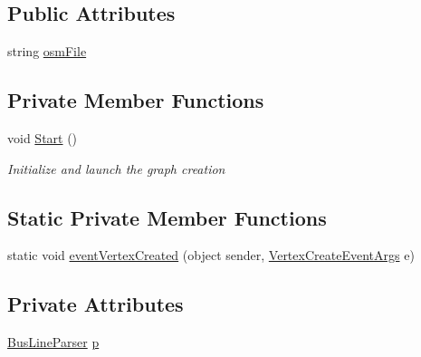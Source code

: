 \subsection*{Public Attributes}
\begin{DoxyCompactItemize}
\item 
string \hyperlink{classGraphInMap_a612a84b6c2a70a8f5fd73db6cc012ae3}{osm\+File}
\end{DoxyCompactItemize}
\subsection*{Private Member Functions}
\begin{DoxyCompactItemize}
\item 
void \hyperlink{classGraphInMap_a093ceede1053f87087bd3e4696fcae09}{Start} ()
\begin{DoxyCompactList}\small\item\em Initialize and launch the graph creation \end{DoxyCompactList}\end{DoxyCompactItemize}
\subsection*{Static Private Member Functions}
\begin{DoxyCompactItemize}
\item 
static void \hyperlink{classGraphInMap_a6fea7c15110ea78076b146139e2a30da}{event\+Vertex\+Created} (object sender, \hyperlink{classVertexCreateEventArgs}{Vertex\+Create\+Event\+Args} e)
\end{DoxyCompactItemize}
\subsection*{Private Attributes}
\begin{DoxyCompactItemize}
\item 
\hyperlink{classBusLineParser}{Bus\+Line\+Parser} \hyperlink{classGraphInMap_ab4e6ee3792c7cf819b1816c24acdcb24}{p}
\end{DoxyCompactItemize}
